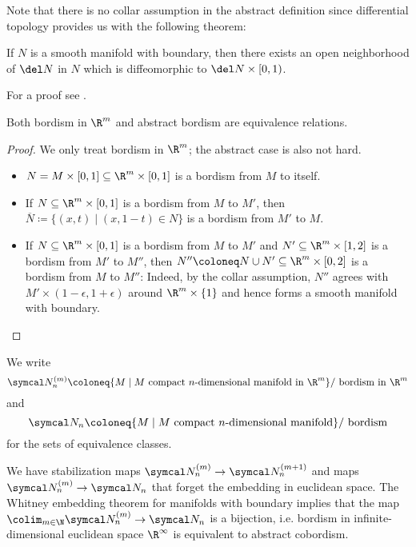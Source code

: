 Note that there is no collar assumption in the abstract definition since differential topology provides us with the following theorem:
\begin{theorem}
	If $N$ is a smooth manifold with boundary, then there exists an open neighborhood of $\del N$ in $N$ which is diffeomorphic to $\del N \times [0, 1)$.
\end{theorem}
For a proof see \cite[Theorem 9.25]{lee_introduction_2012}.
\begin{lemma}
	Both bordism in $\R^m$ and abstract bordism are equivalence relations.
\end{lemma}
\begin{proof}
	We only treat bordism in $\R^m$; the abstract case is also not hard.
	\begin{itemize}
		\item {} $N = M \times [0, 1] \subseteq \R^m \times [0, 1]$ is a bordism from $M$ to itself.
		\item {} If $N \subseteq \R^m \times [0, 1]$ is a bordism from $M$ to $M'$, then $\overline{N} \coloneq \{(x, t) \mid (x, 1 - t) \in N\}$ is a bordism from $M'$ to $M$.
		\item {} If $N \subseteq \R^m \times [0, 1]$ is a bordism from $M$ to $M'$ and $N' \subseteq \R^m \times [1, 2]$ is a bordism from $M'$ to $M''$, then $N'' \coloneq N \cup N' \subseteq \R^m \times [0, 2]$ is a bordism from $M$ to $M''$:
			Indeed, by the collar assumption, $N''$ agrees with $M' \times (1 - \epsilon, 1 + \epsilon)$ around $\R^m \times \{1\}$ and hence forms a smooth manifold with boundary.
			\qedhere
	\end{itemize}
\end{proof}
We write 
\begin{equation*}
	\Bord_n^{(m)} \coloneq \{M \mid M \text{ compact } n \text{-dimensional manifold in } \R^m\} / \text{ bordism in } \R^m
\end{equation*}
and 
\begin{equation*}
	\Bord_n \coloneq \{M \mid M \text{ compact } n \text{-dimensional manifold}\} / \text{ bordism}
\end{equation*}
for the sets of equivalence classes.

We have stabilization maps $\Bord_n^{(m)} \to \Bord_n^{(m + 1)}$ and maps $\Bord_n^{(m)} \to \Bord_n$ that forget the embedding in euclidean space.
The Whitney embedding theorem for manifolds with boundary implies that the map $\colim_{m \in \N} \Bord_n^{(m)} \to \Bord_n$ is a bijection, i.e. bordism in infinite-dimensional euclidean space $\R^\infty$ is equivalent to abstract cobordism.

